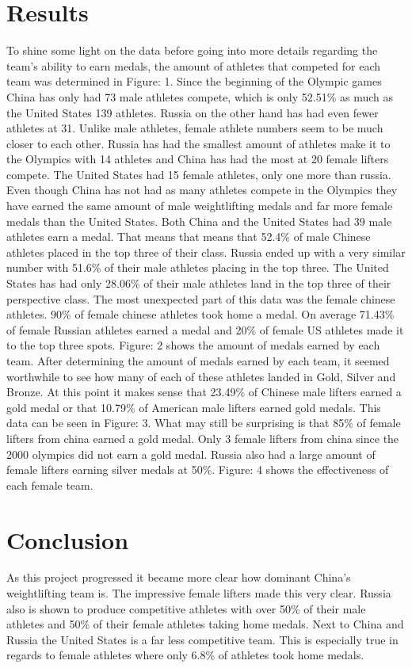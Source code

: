 \documentclass{article}
\begin{document}
\section{Results}
	To shine some light on the data before going into more details regarding the team's ability to earn medals, the amount of athletes that competed for each team was determined in Figure: 1. Since the beginning of the Olympic games China has only had 73 male athletes compete, which is only 52.51\% as much as the United States 139 athletes. Russia on the other hand has had even fewer athletes at 31. Unlike male athletes, female athlete numbers seem to be much closer to each other. Russia has had the smallest amount of athletes make it to the Olympics with 14 athletes and China has had the most at 20 female lifters compete. The United States had 15 female athletes, only one more than russia. 
\newline
\break
	Even though China has not had as many athletes compete in the Olympics they have earned the same amount of male weightlifting medals and far more female medals than the United States. Both China and the United States had 39 male athletes earn a medal. That means that means that 52.4\% of male Chinese athletes placed in the top three of their class. Russia ended up with a very similar number with 51.6\% of their male athletes placing in the top three. The United States has had only 28.06\% of their male athletes land in the top three of their perspective class. The most unexpected part of this data was the female chinese athletes. 90\% of female chinese athletes took home a medal. On average 71.43\% of female Russian athletes earned a medal and 20\% of female US athletes made it to the top three spots. Figure: 2 shows the amount of medals earned by each team.
\newline
\break
	After determining the amount of medals earned by each team, it seemed worthwhile to see how many of each of these athletes landed in Gold, Silver and Bronze. At this point it makes sense that 23.49\% of Chinese male lifters earned a gold medal or that 10.79\% of American male lifters earned gold medals. This data can be seen in Figure: 3. What may still be surprising is that 85\% of female lifters from china earned a gold medal.  Only 3 female lifters from china since the 2000 olympics did not earn a gold medal. Russia also had a large amount of female lifters earning silver medals at 50\%. Figure: 4 shows the effectiveness of each female team.

\section{Conclusion}
	As this project progressed it became more clear how dominant China's weightlifting team is. The impressive female lifters made this very clear. Russia also is shown to produce competitive athletes with over 50\% of their male athletes and 50\% of their female athletes taking home medals. Next to China and Russia the United States is a far less competitive team. This is especially true in regards to female athletes where only 6.8\% of athletes took home medals.
\end{document}
